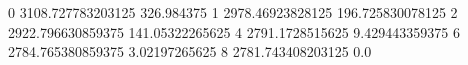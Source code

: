 0 3108.727783203125 326.984375
1 2978.46923828125 196.725830078125
2 2922.796630859375 141.05322265625
4 2791.1728515625 9.429443359375
6 2784.765380859375 3.02197265625
8 2781.743408203125 0.0

